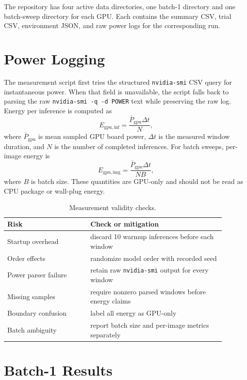 \documentclass[conference]{IEEEtran}
\begin{document}
The repository has four active data directories, one batch-1 directory and one
batch-sweep directory for each GPU. Each contains the summary CSV, trial CSV,
environment JSON, and raw power logs for the corresponding run.

\section{Power Logging}

The measurement script first tries the structured \texttt{nvidia-smi} CSV query
for instantaneous power. When that field is unavailable, the script falls back
to parsing the raw \texttt{nvidia-smi -q -d POWER} text while preserving the
raw log. Energy per inference is computed as
\begin{equation}
E_{\mathrm{gpu,inf}} =
\frac{\bar{P}_{\mathrm{gpu}}\Delta t}{N},
\end{equation}
where $\bar{P}_{\mathrm{gpu}}$ is mean sampled GPU board power, $\Delta t$ is
the measured window duration, and $N$ is the number of completed inferences.
For batch sweeps, per-image energy is
\begin{equation}
E_{\mathrm{gpu,img}} =
\frac{\bar{P}_{\mathrm{gpu}}\Delta t}{NB},
\end{equation}
where $B$ is batch size. These quantities are GPU-only and should not be read
as CPU package or wall-plug energy.

\begin{table}[t]
\centering
\caption{Measurement validity checks.}
\label{tab:checks}
\scriptsize
\begin{tabular}{@{}L{0.34\linewidth}L{0.55\linewidth}@{}}
\toprule
Risk & Check or mitigation\\
\midrule
Startup overhead & discard 10 warmup inferences before each window\\
Order effects & randomize model order with recorded seed\\
Power parser failure & retain raw \texttt{nvidia-smi} output for every window\\
Missing samples & require nonzero parsed windows before energy claims\\
Boundary confusion & label all energy as GPU-only\\
Batch ambiguity & report batch size and per-image metrics separately\\
\bottomrule
\end{tabular}
\end{table}

\section{Batch-1 Results}
\end{document}
